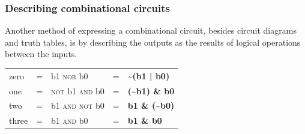 \documentclass[12pt, a4paper, oneside]{memoir}
\renewcommand{\lnot}{\textasciitilde{}}
\begin{document}
\subsubsection{Describing combinational circuits}
Another method of expressing a combinational circuit, besides circuit diagrams and truth tables, is by describing the outputs as the results of logical operations between the inputs.
\begin{table}[ht]
  \centering
  \begin{tabular}{lclcl @{\vspace{5pt}}}
    zero &=& b1 \textsc{nor} b0 &=& \textbf{\lnot{}(b1 | b0)} \\
    one &=& \textsc{not} b1 \textsc{and} b0&=& \textbf{(\lnot{}b1) \& b0} \\
    two &=& b1 \textsc{and} \textsc{not} b0&=& \textbf{b1 \& (\lnot{}b0)}\\
    three &=& b1 \textsc{and} b0&=&\textbf{b1 \& b0} \\
  \end{tabular}
\end{table}
\end{document}
